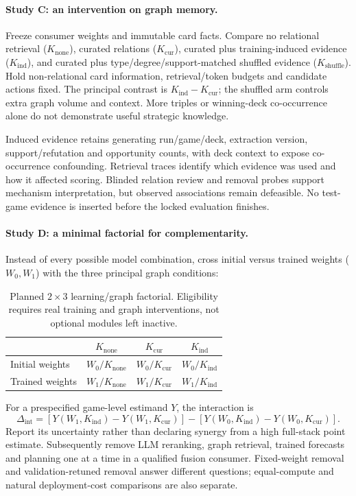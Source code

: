 \documentclass[11pt,a4paper]{article}
\theoremstyle{definition}
\theoremstyle{plain}
\begin{document}
\paragraph{Study C: an intervention on graph memory.}
Freeze consumer weights and immutable card facts. Compare no relational
retrieval ($K_{\mathrm{none}}$), curated relations ($K_{\mathrm{cur}}$),
curated plus training-induced evidence ($K_{\mathrm{ind}}$), and curated plus
type/degree/support-matched shuffled evidence ($K_{\mathrm{shuffle}}$).
Hold non-relational card information, retrieval/token budgets and candidate
actions fixed. The principal contrast is
$K_{\mathrm{ind}}-K_{\mathrm{cur}}$; the shuffled arm controls extra graph
volume and context. More triples or winning-deck co-occurrence alone do not
demonstrate useful strategic knowledge.

Induced evidence retains generating run/game/deck, extraction version,
support/refutation and opportunity counts, with deck context to expose
co-occurrence confounding. Retrieval traces identify which evidence was
used and how it affected scoring. Blinded relation review and removal probes
support mechanism interpretation, but observed associations remain defeasible.
No test-game evidence is inserted before the locked evaluation finishes.

\paragraph{Study D: a minimal factorial for complementarity.}
Instead of every possible model combination, cross initial versus trained
weights ($W_0,W_1$) with the three principal graph conditions:
\begin{table}[ht]
\centering
\begin{tabular}{lccc}
\toprule
 & $K_{\mathrm{none}}$ & $K_{\mathrm{cur}}$ & $K_{\mathrm{ind}}$ \\
\midrule
Initial weights & $W_0/K_{\mathrm{none}}$ & $W_0/K_{\mathrm{cur}}$ & $W_0/K_{\mathrm{ind}}$ \\
Trained weights & $W_1/K_{\mathrm{none}}$ & $W_1/K_{\mathrm{cur}}$ & $W_1/K_{\mathrm{ind}}$ \\
\bottomrule
\end{tabular}
\caption{Planned $2\times3$ learning/graph factorial. Eligibility requires
real training and graph interventions, not optional modules left inactive.}
\label{tab:learning-factorial}
\end{table}
For a prespecified game-level estimand $Y$, the interaction is
\begin{equation}
\Delta_{\mathrm{int}}=
[Y(W_1,K_{\mathrm{ind}})-Y(W_1,K_{\mathrm{cur}})]
-[Y(W_0,K_{\mathrm{ind}})-Y(W_0,K_{\mathrm{cur}})].
\end{equation}
Report its uncertainty rather than declaring synergy from a high full-stack
point estimate. Subsequently remove LLM reranking, graph retrieval, trained
forecasts and planning one at a time in a qualified fusion consumer.
Fixed-weight removal and validation-retuned removal answer different questions;
equal-compute and natural deployment-cost comparisons are also separate.
\end{document}
